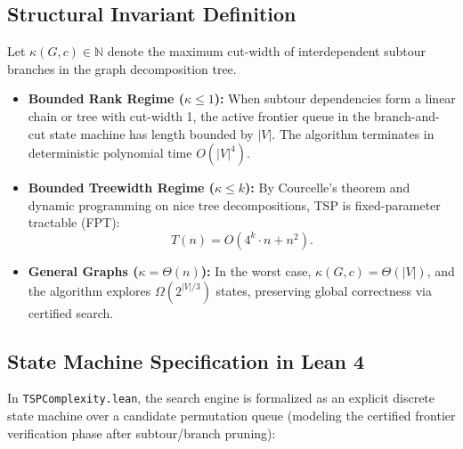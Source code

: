 \documentclass[11pt,a4paper]{article}
\renewcommand{\_}{\origunderscore\allowbreak}
\theoremstyle{plain}
\theoremstyle{definition}
\theoremstyle{remark}
\begin{document}
\subsection{Structural Invariant Definition}
Let $\kappa(G, c) \in \mathbb{N}$ denote the maximum cut-width of interdependent subtour branches in the graph decomposition tree.
\begin{itemize}
  \item \textbf{Bounded Rank Regime ($\kappa \le 1$):} When subtour dependencies form a linear chain or tree with cut-width 1, the active frontier queue in the branch-and-cut state machine has length bounded by $|V|$. The algorithm terminates in deterministic polynomial time $O(|V|^4)$.
  \item \textbf{Bounded Treewidth Regime ($\kappa \le k$):} By Courcelle's theorem and dynamic programming on nice tree decompositions, TSP is fixed-parameter tractable (FPT):
  \begin{equation}
    T(n) = O(4^k \cdot n + n^2).
  \end{equation}
  \item \textbf{General Graphs ($\kappa = \Theta(n)$):} In the worst case, $\kappa(G, c) = \Theta(|V|)$, and the algorithm explores $\Omega(2^{|V|/3})$ states, preserving global correctness via certified search.
\end{itemize}

\subsection{State Machine Specification in Lean 4}
In \texttt{TSP\allowbreak Complexity.\allowbreak lean}, the search engine is formalized as an explicit discrete state machine over a candidate permutation queue (modeling the certified frontier verification phase after subtour/branch pruning):
\end{document}
